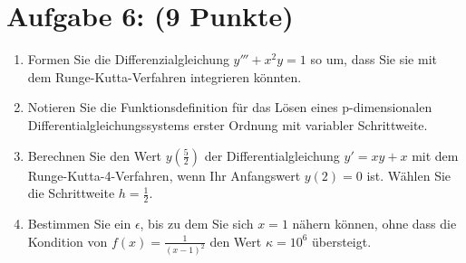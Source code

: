\documentclass[12pt]{article}
\begin{document}
\section*{Aufgabe 6: (9 Punkte)}
\begin{enumerate}
	\item Formen Sie die Differenzialgleichung $y''' + x^2y = 1$ so um, dass Sie sie mit dem Runge-Kutta-Verfahren integrieren könnten.

	      \vspace{2.5cm}

	\item Notieren Sie die Funktionsdefinition für das Lösen eines p-dimensionalen Differentialgleichungssystems erster Ordnung mit variabler Schrittweite.

	      \vspace{2.5cm}

	\item Berechnen Sie den Wert $y(\frac{5}{2})$ der Differentialgleichung $y' = xy + x$ mit dem Runge-Kutta-4-Verfahren, wenn Ihr Anfangswert $y(2) = 0$ ist. Wählen Sie die Schrittweite $h = \frac{1}{2}$.

	      \vspace{7cm}

	\item Bestimmen Sie ein $\epsilon$, bis zu dem Sie sich $x=1$ nähern können, ohne dass die Kondition von $f(x) = \frac{1}{(x-1)^2}$ den Wert $\kappa = 10^6$ übersteigt.

\end{enumerate}
\pagebreak
\end{document}
